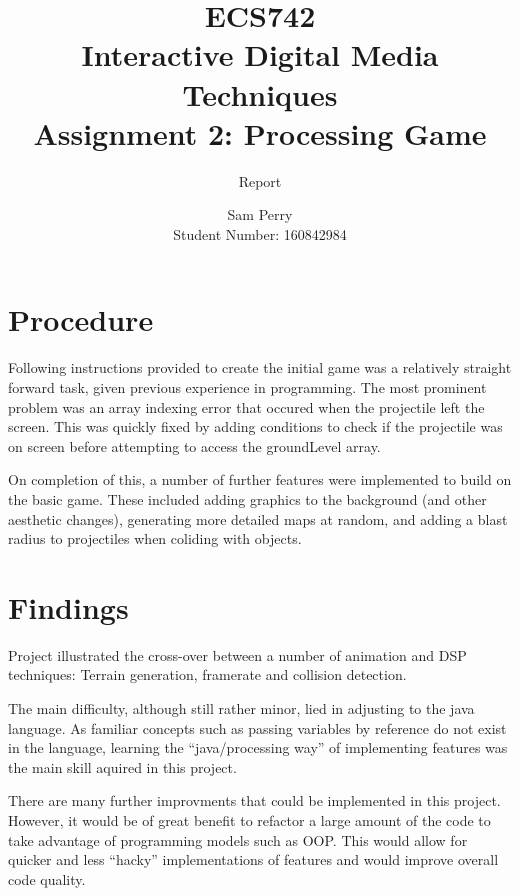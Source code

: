\documentclass[titlepage]{scrartcl}
\begin{document}
    \title{ECS742\\Interactive Digital Media Techniques\\Assignment 2: Processing Game}
    \subtitle{\LARGE{Report}}
    \author{Sam Perry\\Student Number: 160842984}
    \date{}

    \maketitle


    \section*{Procedure}
    Following instructions provided to create the initial game was a relatively
    straight forward task, given previous experience in programming. The most
    prominent problem was an array indexing error that occured when the
    projectile left the screen. This was quickly fixed by adding conditions to
    check if the projectile was on screen before attempting to access the
    groundLevel array.

    On completion of this, a number of further features were implemented to
    build on the basic game. These included adding graphics to the background
    (and other aesthetic changes), generating more detailed maps at random, and
    adding a blast radius to projectiles when coliding with objects.

    \section*{Findings}
    Project illustrated the cross-over between a number of animation and DSP
    techniques: Terrain generation, framerate and collision detection.
    
    The main difficulty, although still rather minor, lied in adjusting to the
    java language. As familiar concepts such as passing variables by reference
    do not exist in the language, learning the ``java/processing way'' of
    implementing features was the main skill aquired in this project.

    There are many further improvments that could be implemented in this
    project. However, it would be of great benefit to refactor a large amount
    of the code to take advantage of programming models such as OOP. This would
    allow for quicker and less ``hacky'' implementations of features and would
    improve overall code quality.
    \printbibliography
\end{document}
